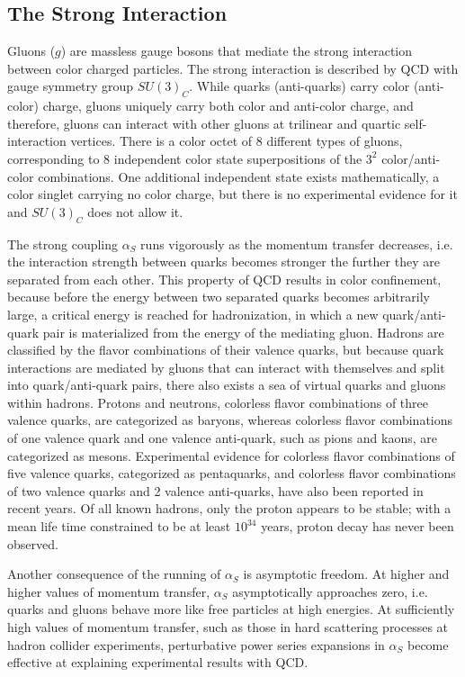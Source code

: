 \subsection{The Strong Interaction}
Gluons ($g$) are massless gauge bosons that mediate the strong interaction between color charged particles.
The strong interaction is described by QCD with gauge symmetry group $SU(3)_C$.
While quarks (anti-quarks) carry color (anti-color) charge, gluons uniquely carry both color and anti-color charge, and therefore, gluons can interact with other gluons at trilinear and quartic self-interaction vertices.
There is a color octet of 8 different types of gluons, corresponding to 8 independent color state superpositions of the $3^2$ color/anti-color combinations.
One additional independent state exists mathematically, a color singlet carrying no color charge, but there is no experimental evidence for it and $SU(3)_C$ does not allow it.

The strong coupling $\alpha_S$ runs vigorously as the momentum transfer decreases, i.e. the interaction strength between quarks becomes stronger the further they are separated from each other.
This property of QCD results in color confinement, because before the energy between two separated quarks becomes arbitrarily large, a critical energy is reached for hadronization, in which a new quark/anti-quark pair is materialized from the energy of the mediating gluon.
Hadrons are classified by the flavor combinations of their valence quarks, but because quark interactions are mediated by gluons that can interact with themselves and split into quark/anti-quark pairs, there also exists a sea of virtual quarks and gluons within hadrons.
Protons and neutrons, colorless flavor combinations of three valence quarks, are categorized as baryons, whereas colorless flavor combinations of one valence quark and one valence anti-quark, such as pions and kaons, are categorized as mesons.
Experimental evidence for colorless flavor combinations of five valence quarks, categorized as pentaquarks, and colorless flavor combinations of two valence quarks and 2 valence anti-quarks, have also been reported in recent years.
Of all known hadrons, only the proton appears to be stable; with a mean life time constrained to be at least $10^34$ years, proton decay has never been observed.

Another consequence of the running of $\alpha_S$ is asymptotic freedom.
At higher and higher values of momentum transfer, $\alpha_S$ asymptotically approaches zero, i.e. quarks and gluons behave more like free particles at high energies.
At sufficiently high values of momentum transfer, such as those in hard scattering processes at hadron collider experiments, perturbative power series expansions in $\alpha_S$ become effective at explaining experimental results with QCD.

